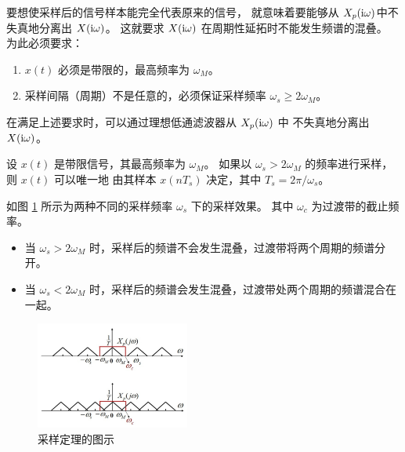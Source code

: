 要想使采样后的信号样本能完全代表原来的信号，
就意味着要能够从 $X_p(\mathrm{i} \omega)$中不失真地分离出 $X(\mathrm{i} \omega)$。
这就要求 $X(\mathrm{i} \omega)$ 在周期性延拓时不能发生频谱的混叠。
为此必须要求：
\begin{enumerate}
    \item $x(t)$ 必须是带限的，最高频率为 $\omega_M$。
    \item 采样间隔（周期）不是任意的，必须保证采样频率 $\omega_s \ge 2\omega_M$。
\end{enumerate}
在满足上述要求时，可以通过理想低通滤波器从 $X_p(\mathrm{i} \omega)$ 中
不失真地分离出 $X(\mathrm{i} \omega)$。

\begin{theorem}
    设 $x(t)$ 是带限信号，其最高频率为 $\omega_M$。
    如果以 $\omega_s > 2\omega_M$ 的频率进行采样，则 $x(t)$ 可以唯一地
    由其样本 $x(nT_s)$ 决定，其中 $T_s = 2\pi/\omega_s$。
\end{theorem}

\begin{example}[采样定理的图示]
    如图 \ref{fig:sampling-theorem} 所示为两种不同的采样频率 $\omega_s$ 下的采样效果。
    其中 $\omega_c$ 为过渡带的截止频率。
    \begin{itemize}
        \item 当 $\omega_s > 2\omega_M$ 时，采样后的频谱不会发生混叠，过渡带将两个周期的频谱分开。
        \item 当 $\omega_s < 2\omega_M$ 时，采样后的频谱会发生混叠，过渡带处两个周期的频谱混合在一起。
    \end{itemize}
    \begin{figure}[H]
        \centering
        \includegraphics[width=0.45\textwidth]{chap2/img/sampling-theorem.png}
        \caption{采样定理的图示}
        \label{fig:sampling-theorem}
    \end{figure}
\end{example}


